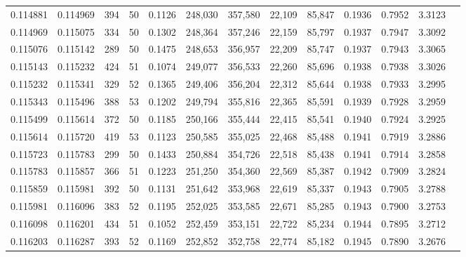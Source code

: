 \begin{tabular}{rrrrrrrrrrrrr}
0.114881 & 0.114969 &   394 &  50 &                                     0.1126 & 248,030 & 357,580 &  22,109 &  85,847 & 0.1936 & 0.7952 & 3.3123 \\
0.114969 & 0.115075 &   334 &  50 &                                     0.1302 & 248,364 & 357,246 &  22,159 &  85,797 & 0.1937 & 0.7947 & 3.3092 \\
0.115076 & 0.115142 &   289 &  50 &                                     0.1475 & 248,653 & 356,957 &  22,209 &  85,747 & 0.1937 & 0.7943 & 3.3065 \\
0.115143 & 0.115232 &   424 &  51 &                                     0.1074 & 249,077 & 356,533 &  22,260 &  85,696 & 0.1938 & 0.7938 & 3.3026 \\
0.115232 & 0.115341 &   329 &  52 &                                     0.1365 & 249,406 & 356,204 &  22,312 &  85,644 & 0.1938 & 0.7933 & 3.2995 \\
0.115343 & 0.115496 &   388 &  53 &                                     0.1202 & 249,794 & 355,816 &  22,365 &  85,591 & 0.1939 & 0.7928 & 3.2959 \\
0.115499 & 0.115614 &   372 &  50 &                                     0.1185 & 250,166 & 355,444 &  22,415 &  85,541 & 0.1940 & 0.7924 & 3.2925 \\
0.115614 & 0.115720 &   419 &  53 &                                     0.1123 & 250,585 & 355,025 &  22,468 &  85,488 & 0.1941 & 0.7919 & 3.2886 \\
0.115723 & 0.115783 &   299 &  50 &                                     0.1433 & 250,884 & 354,726 &  22,518 &  85,438 & 0.1941 & 0.7914 & 3.2858 \\
0.115783 & 0.115857 &   366 &  51 &                                     0.1223 & 251,250 & 354,360 &  22,569 &  85,387 & 0.1942 & 0.7909 & 3.2824 \\
0.115859 & 0.115981 &   392 &  50 &                                     0.1131 & 251,642 & 353,968 &  22,619 &  85,337 & 0.1943 & 0.7905 & 3.2788 \\
0.115981 & 0.116096 &   383 &  52 &                                     0.1195 & 252,025 & 353,585 &  22,671 &  85,285 & 0.1943 & 0.7900 & 3.2753 \\
0.116098 & 0.116201 &   434 &  51 &                                     0.1052 & 252,459 & 353,151 &  22,722 &  85,234 & 0.1944 & 0.7895 & 3.2712 \\
0.116203 & 0.116287 &   393 &  52 &                                     0.1169 & 252,852 & 352,758 &  22,774 &  85,182 & 0.1945 & 0.7890 & 3.2676 \\

\end{tabular}

